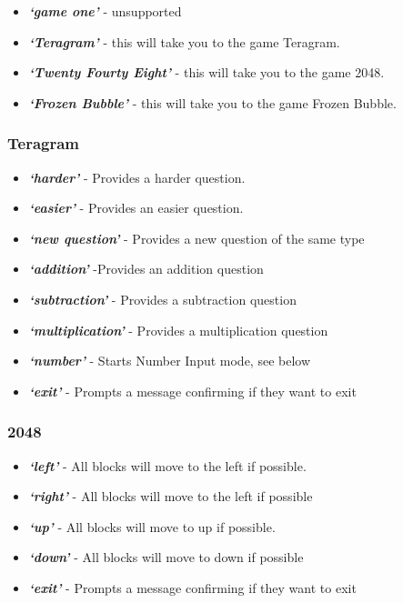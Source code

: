 \documentclass[11pt, oneside]{article}
\begin{document}
\begin{itemize}
  \item {\em\bf`game one'} - unsupported
  \item {\em\bf`Teragram'}  - this will take you to the game Teragram.
  \item {\em\bf`Twenty Fourty Eight'} - this will take you to the game 2048.
  \item {\em\bf`Frozen Bubble'} - this will take you to the game Frozen Bubble.
\end{itemize}

\subsubsection*{Teragram}

\begin{itemize}
  \item {\em\bf`harder'} - Provides a harder question. 
  \item {\em\bf`easier'} - Provides an easier question.
  \item {\em\bf`new question'} - Provides a new question of the same type
  \item {\em\bf`addition'} -Provides an addition question
  \item {\em\bf`subtraction'} - Provides a subtraction question
  \item {\em\bf`multiplication'} - Provides a multiplication question 
  \item {\em\bf`number'} - Starts Number Input mode, see below
  \item {\em\bf`exit'} - Prompts a message confirming if they want to exit
 
\end{itemize}

\subsubsection*{2048}

\begin{itemize}
	\item {\em\bf`left'} - All blocks will move to the left if possible. 
	\item {\em\bf`right'} - All blocks will move to the left if possible
	\item {\em\bf`up'} - All blocks will move to up if possible. 
	\item {\em\bf`down'} - All blocks will move to down if possible
	\item {\em\bf`exit'} - Prompts a message confirming if they want to exit
	
\end{itemize}
\end{document}

